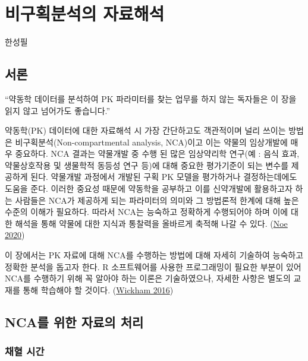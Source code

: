 \documentclass[
  11pt,
  krantz2, a4paper, twoside]{krantz}
\renewenvironment{quote}{\begin{VF}}{\end{VF}}
\theoremstyle{definition}
\theoremstyle{definition}
\theoremstyle{definition}
\theoremstyle{definition}
\theoremstyle{remark}
\begin{document}
\hypertarget{nca-analysis}{%
\chapter{비구획분석의 자료해석}\label{nca-analysis}}

\Large\hfill

한성필
\normalsize

\hypertarget{uxc11cuxb860-2}{%
\section{서론}\label{uxc11cuxb860-2}}

\begin{quote}
``약동학 데이터를 분석하여 PK 파라미터를 찾는 업무를 하지 않는 독자들은 이 장을 읽지 않고 넘어가도 좋습니다.''
\end{quote}

약동학(PK) 데이터에 대한 자료해석 시 가장 간단하고도 객관적이며 널리 쓰이는 방법은 비구획분석(Non-compartmental analysis, NCA)이고 이는 약물의 임상개발에 매우 중요하다.
NCA 결과는 약물개발 중 수행 된 많은 임상약리학 연구(예 : 음식 효과, 약물상호작용 및 생물학적 동등성 연구 등)에 대해 중요한 평가기준이 되는 변수를 제공하게 된다.
약물개발 과정에서 개발된 구획 PK 모델을 평가하거나 결정하는데에도 도움을 준다.
이러한 중요성 때문에 약동학을 공부하고 이를 신약개발에 활용하고자 하는 사람들은 NCA가 제공하게 되는 파라미터의 의미와 그 방법론적 한계에 대해 높은 수준의 이해가 필요하다. 
따라서 NCA는 능숙하고 정확하게 수행되어야 하며 이에 대한 해석을 통해 약물에 대한 지식과 통찰력을 올바르게 축적해 나갈 수 있다. (\protect\hyperlink{ref-noe2020parameter}{Noe 2020})

이 장에서는 PK 자료에 대해 NCA를 수행하는 방법에 대해 자세히 기술하여 능숙하고 정확한 분석을 돕고자 한다. R 소프트웨어를 사용한 프로그래밍이 필요한 부분이 있어 NCA를 수행하기 위해 꼭 알아야 하는 이론은 기술하였으나, 자세한 사항은 별도의 교재를 통해 학습해야 할 것이다. (\protect\hyperlink{ref-ggplot22016}{Wickham 2016})

\hypertarget{data-prep}{%
\section{NCA를 위한 자료의 처리}\label{data-prep}}

\hypertarget{uxcc44uxd608-uxc2dcuxac04}{%
\subsection{채혈 시간}\label{uxcc44uxd608-uxc2dcuxac04}}
\end{document}
